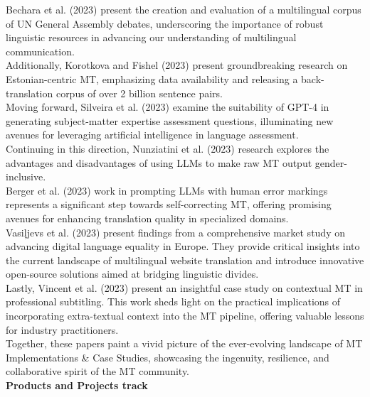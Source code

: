 Bechara et al. (2023) present the creation and evaluation of a multilingual corpus of UN General Assembly debates, underscoring the importance of robust linguistic resources in advancing our understanding of multilingual communication.
\\

Additionally, Korotkova and Fishel (2023) present groundbreaking research on Estonian-centric MT, emphasizing data availability and releasing a back-translation corpus of over 2 billion sentence pairs.
\\

Moving forward, Silveira et al. (2023) examine the suitability of GPT-4 in generating subject-matter expertise assessment questions, illuminating new avenues for leveraging artificial intelligence in language assessment.
\\

Continuing in this direction, Nunziatini et al. (2023) research explores the advantages and disadvantages of using LLMs to make raw MT output gender-inclusive.
\\

Berger et al. (2023) work in prompting LLMs with human error markings represents a significant step towards self-correcting MT, offering promising avenues for enhancing translation quality in specialized domains.
\\

Vasiļjevs et al. (2023) present findings from a comprehensive market study on advancing digital language equality in Europe. They provide critical insights into the current landscape of multilingual website translation and introduce innovative open-source solutions aimed at bridging linguistic divides.
\\

Lastly, Vincent et al. (2023) present an insightful case study on contextual MT in professional subtitling. This work sheds light on the practical implications of incorporating extra-textual context into the MT pipeline, offering valuable lessons for industry practitioners.
\\

Together, these papers paint a vivid picture of the ever-evolving landscape of MT Implementations \& Case Studies, showcasing the ingenuity, resilience, and collaborative spirit of the MT community.
\\

{\bf Products and Projects track} 
\\

